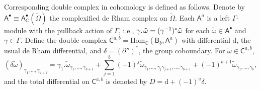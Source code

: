 \documentclass[a4paper,11pt]{article}
\newcommand{\dd}{\mathrm{d}}
\newcommand{\compfontui}[1]{\bm{\mathsf{#1}}^{\bullet}}
\newcommand{\compfont}[1]{\bm{\mathsf{#1}}}
\begin{document}
Corresponding double complex in cohomology is defined as follows. Denote by $\compfontui{A}\equiv\compfontui{A}_{\mathbb{C}}(\tilde{\Omega})$ the complexified de Rham complex on $\tilde{\Omega}$. Each $\compfont{A}^a$ is a left $\Gamma$-module with the pullback action of $\Gamma$, i.e., $\gamma.\hspace{.5mm}\tilde{\omega}=(\gamma^{-1})^{*}\tilde{\omega}$  for each $\tilde{\omega}\in \compfontui{A}$ and $\gamma\in \Gamma$. Define the double complex $\compfont{C}^{a,b}=\text{Hom}_{\mathbb{C}}(\compfont{B}_{b},\compfont{A}^a)$ with differential $\dd$, the usual de Rham differential, and $\delta=(\partial'')^{*}$, the group coboundary. For $\tilde{\omega}\in \compfont{C}^{a,b}$,
\begin{equation}
(\delta\tilde{\omega})_{\gamma_1,...,\gamma_{b+1}} = \gamma_1. \tilde{\omega}_{\gamma_1,...,\gamma_{b+1}}+\sum_{j=1}^{b}(-1)^{j} \tilde\omega_{\gamma_1,...,\gamma_{j}\gamma_{j+1},...,\gamma_{b+1}}+(-1)^{b+1}\tilde\omega_{\gamma_1,...,\gamma_b},\label{deltatildew}
\end{equation}
and the total differential on $\compfont{C}^{a,b}$ is denoted by $D=\dd+(-1)^{a}\delta$.
\end{document}
